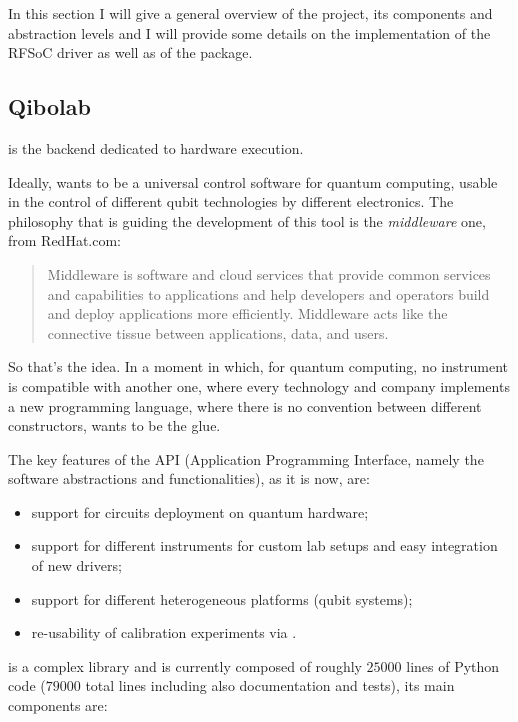 In this section I will give a general overview of the \Qibolab project, its components and abstraction levels and I will provide some details on the implementation of the RFSoC driver as well as of the \Qibosoq package. 

\subsection{Qibolab}

\Qibolab is the \Qibo backend dedicated to hardware execution.

Ideally, \Qibolab wants to be a universal control software for quantum computing, usable in the control of different qubit technologies by different electronics.
The philosophy that is guiding the development of this tool is the \textit{middleware} one, from RedHat.com:
\begin{quote}
    Middleware is software and cloud services that provide common services and capabilities to applications and help developers and operators build and deploy applications more efficiently. Middleware acts like the connective tissue between applications, data, and users.
\end{quote}

So that's the idea. In a moment in which, for quantum computing, no instrument is compatible with another one, where every technology and company implements a new programming language, where there is no convention between different constructors, \Qibolab wants to be the glue.

The key features of the API (Application Programming Interface, namely the software abstractions and functionalities), as it is now, are:
\begin{itemize}
    \item support for \Qibo circuits deployment on quantum hardware;
    \item support for different instruments for custom lab setups and easy integration of new drivers;
    \item support for different heterogeneous platforms (qubit systems);
    \item re-usability of calibration experiments via \Qibocal.
\end{itemize}

\Qibolab is a complex library and is currently composed of roughly $25000$ lines of Python code ($79000$ total lines including also documentation and tests), its main components are:

